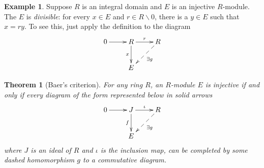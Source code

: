 \documentclass{amsart}[12pt]
\newcommand{\DEF}[1]{\emph{#1}\index{#1}}
\numberwithin{equation}{section}
\theoremstyle{plain} %
\newtheorem{thm}[equation]{Theorem}
\theoremstyle{definition}
\newtheorem{ex}[equation]{Example}
\theoremstyle{remark}
\begin{document}
\begin{ex} Suppose $R$ is an integral domain and $E$ is an injective $R$-module. The $E$ is \DEF{divisible}: for every $x\in E$ and $r\in R\smallsetminus 0$, there is a $y\in E$ such that $x=ry$.
To see this, just apply the definition to the diagram
$$
\xymatrix{
0 \ar[r] & R \ar[d]_-{x} \ar[r]^r & R \ar@{-->}[dl]^{\exists g} \\ 
& E \\
}
$$
\end{ex}



\begin{thm}[Baer's criterion]
\label{thm:baer}
 For any ring $R$, an $R$-module  $E$ is injective if and only if every diagram of the form represented below in solid arrows
$$
\xymatrix{
0 \ar[r] & J \ar[d]_-f \ar[r]^\iota & R \ar@{-->}[dl]^{\exists g} \\ 
& E \\
}
$$
where $J$ is an ideal of $R$  and $\iota$ is the inclusion map,  can be completed by some dashed homomorphism $g$  to a commutative diagram.
\end{thm}
\end{document}
